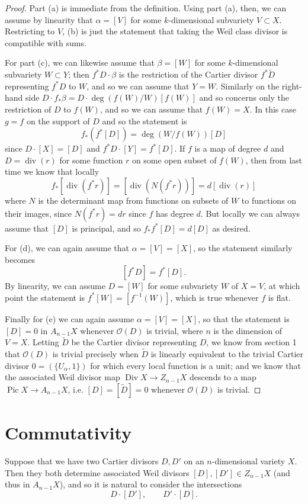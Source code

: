 \documentclass[leqno, openany]{memoir}
\theoremstyle{definition}
\theoremstyle{remark}
\theoremstyle{plain}
\theoremstyle{definition}
\theoremstyle{remark}
\newcommand{\msc}[1]{\mathscr{#1}}
\renewcommand{\div}{\operatorname{div}}
\DeclareMathOperator{\Pic}{Pic}
\DeclareMathOperator{\Div}{Div}
\begin{document}
\begin{proof}
Part (a) is immediate from the definition. Using part (a), then, we can assume by linearity that $\alpha = [V]$ for some $k$-dimensional subvariety $V \subset X$. Restricting to $V$, (b) is just the statement that taking the Weil class divisor is compatible with sums.

For part (c), we can likewise assume that $\beta = [W]$ for some $k$-dimensional subvariety $W \subset Y$; then $f^* D \cdot \beta$ is the restriction of the Cartier divisor $f^* \tilde D$ representing $f^* D$ to $W$, and so we can assume that $Y = W$. Similarly on the right-hand side $D \cdot f_* \beta = D \cdot \deg(f(W)/W) [f(W)]$ and so concerns only the restriction of $D$ to $f(W)$, and so we can assume that $f(W) = X$. In this case $g = f$ on the support of $D$ and so the statement is \[ f_* (f^* [D]) = \deg(W/f(W)) [D] \] since $D \cdot [X] = [D]$ and $f^* D \cdot [Y] = f^* [D]$. If $f$ is a map of degree $d$ and $D = \div(r)$ for some function $r$ on some open subset of $f(W)$, then from last time we know that locally \[ f_* [\div(f^* r)] = [\div(N(f^* r))] = d [\div(r)] \] where $N$ is the determinant map from functions on subsets of $W$ to functions on their images, since $N(f^* r) = dr$ since $f$ has degree $d$. But locally we can always assume that $[D]$ is principal, and so $f_* f^* [D] = d [D]$ as desired.

For (d), we can again assume that $\alpha = [V] = [X]$, so the statement similarly becomes \[ [f^* D] = f^* [D] . \] By linearity, we can assume $D = [W]$ for some subvariety $W$ of $X = V$, at which point the statement is $f^* [W] = [f^{-1}(W)]$, which is true whenever $f$ is flat.

Finally for (e) we can again assume $\alpha = [V] = [X]$, so that the statement is $[D] = 0$ in $A_{n-1} X$ whenever $\msc{O}(D)$ is trivial, where $n$ is the dimension of $V = X$. Letting $\tilde D$ be the Cartier divisor representing $D$, we know from section 1 that $\msc{O}(D)$ is trivial precisely when $\tilde D$ is linearly equivalent to the trivial Cartier divisor $0 = (\{U_\alpha, 1\})$ for which every local function is a unit; and we know that the associated Weil divisor map $\Div X \to Z_{n-1} X$ descends to a map $\Pic X \to A_{n-1} X$, i.e. $[D] = [\tilde D] = 0$ whenever $\msc{O}(D)$ is trivial.
\end{proof}

\section{Commutativity}
Suppose that we have two Cartier divisors $D, D'$ on an $n$-dimensional variety $X$. Then they both determine associated Weil divisors $[D], [D'] \in Z_{n-1} X$ (and thus in $A_{n-1} X$), and so it is natural to consider the intersections \[ D \cdot [D'], \qquad D' \cdot [D] . \]
\end{document}
